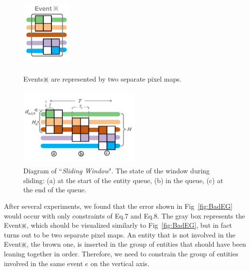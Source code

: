 \documentclass[review,journal]{vgtc}         %
\begin{document}
\begin{figure}[h]
	\begin{minipage}[t]{0.3\linewidth}
		\flushright
		\vspace{0em}
		\centerline{\includegraphics[width=1in,height=3.5cm]{Fig/BadEG.pdf}}
		\vspace{-0.5em}
		\caption{Events$\divideontimes$ are represented by two separate pixel maps.}
		\label{fig:BadEG}
		\vspace{-0.5em}
	\end{minipage}
	\hspace{.2in}
	\begin{minipage}[t]{0.6\linewidth}
		\flushright
		\vspace{-1em}
		\centerline{\includegraphics[width=2.4in,height=4cm]{Fig/EG.pdf}}
		\vspace{-1em}
		\caption{Diagram of ``\textit{Sliding Window}". The state of the window during sliding: (a) at the start of the entity queue, (b) in the queue, (c) at the end of the queue.}
		\label{fig:EG}
		\vspace{-0.5em}
	\end{minipage}
\end{figure}

After several experiments, we found that the error shown in Fig~\ref{fig:BadEG} would occur with only constraints of Eq.7 and Eq.8. The gray box represents the Event$\divideontimes$, which should be visualized similarly to Fig~\ref{fig:BadEG}, but in fact turns out to be two separate pixel maps. An entity that is not involved in the Event$\divideontimes$, the brown one, is inserted in the group of entities that should have been leaning together in order. Therefore, we need to constrain the group of entities involved in the same event $e$ on the vertical axis.
\end{document}
